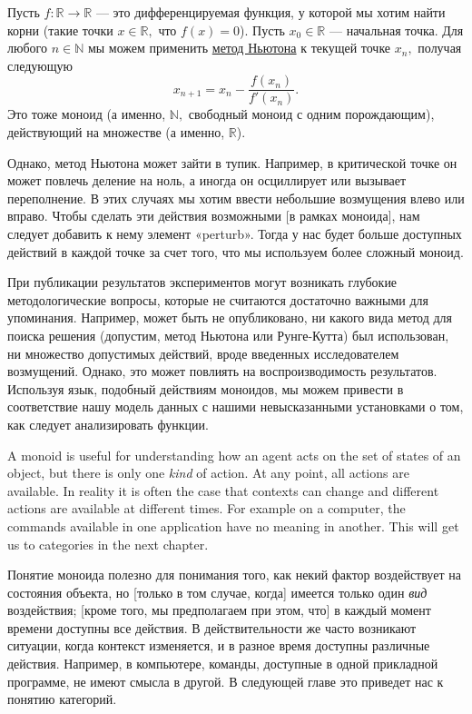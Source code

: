 \documentclass[../main/CT4S-EN-RU]{subfiles}
\begin{document}
\begin{applicationRUS}
Пусть $f\colon{ℝ}{→}{ℝ}$ — это дифференцируемая функция, у которой мы хотим найти корни (такие точки $x\in{ℝ},$ что $f(x)=0$). Пусть $x_0\in{ℝ}$ — начальная точка. Для любого $n\in{ℕ}$ мы можем применить \href{https://ru.wikipedia.org/wiki/%D0%9C%D0%B5%D1%82%D0%BE%D0%B4_%D0%9D%D1%8C%D1%8E%D1%82%D0%BE%D0%BD%D0%B0}{\text метод Ньютона} к текущей точке $x_n,$ получая следующую $$x_{n+1}=x_n-\frac{f(x_n)}{f'(x_n)}.$$
Это тоже моноид (а именно, ${ℕ},$ свободный моноид с одним порождающим), действующий на множестве (а именно, ${ℝ}$).

Однако, метод Ньютона может зайти в тупик. Например, в критической точке он может повлечь деление на ноль, а иногда он осциллирует или вызывает переполнение. В этих случаях мы хотим ввести небольшие возмущения влево или вправо. Чтобы сделать эти действия возможными [в рамках моноида], нам следует добавить к нему элемент «perturb». Тогда у нас будет больше доступных действий в каждой точке за счет того, что мы используем более сложный моноид.

При публикации результатов экспериментов могут возникать глубокие методологические вопросы, которые не считаются достаточно важными для упоминания. Например, может быть не опубликовано, ни какого вида метод для поиска решения (допустим, метод Ньютона или Рунге-Кутта) был использован, ни множество допустимых действий, вроде введенных исследователем возмущений. Однако, это может повлиять на воспроизводимость результатов. Используя язык, подобный действиям моноидов, мы можем привести в соответствие нашу модель данных с нашими невысказанными установками о том, как следует анализировать функции.
\end{applicationRUS}

\begin{remarkENG}
A monoid is useful for understanding how an agent acts on the set of states of an object, but there is only one {\em kind} of action. At any point, all actions are available. In reality it is often the case that contexts can change and different actions are available at different times. For example on a computer, the commands available in one application have no meaning in another. This will get us to categories in the next chapter.
\end{remarkENG}

\begin{remarkRUS}
Понятие моноида полезно для понимания того, как некий фактор воздействует на состояния объекта, но [только в том случае, когда] имеется только один {\em вид} воздействия; [кроме того, мы предполагаем при этом, что] в каждый момент времени доступны все действия. В действительности же часто возникают ситуации, когда контекст изменяется, и в разное время доступны различные действия. Например, в компьютере, команды, доступные в одной прикладной программе, не имеют смысла в другой. В следующей главе это приведет нас к понятию категорий.
\end{remarkRUS}
\end{document}
